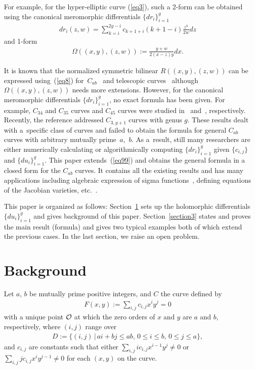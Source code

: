 \documentclass[pdftex]{sigma}
\numberwithin{equation}{section}
\theoremstyle{definition}
\begin{document}
For example, for the hyper-elliptic curve (\ref{eq3}), such a 2-form can be obtained using the canonical meromorphic dif\/ferentials $\{dr_i\}_{i=1}^g$
\begin{gather}\label{eq99}
dr_i(z,w)=\sum_{k=i}^{2g-i}c_{k+1+i}(k+1-i)\frac{z^{k}}{2w}dz
\end{gather}
and 1-form
\begin{gather*}\Omega((x,y),(z,w)):=\frac{y+w}{2(x-z)y}dx .\end{gather*}

It is known that the normalized symmetric bilinear $R((x,y),(z,w))$ can be expressed using~(\ref{eq8}) for~$C_{ab}$~\cite{nakayashiki} and telescopic curves~\cite{ayano} although $\Omega((x,y),(z,w))$ needs more extensions. However, for the canonical meromorphic dif\/ferentials $\{dr_i\}_{i=1}^g$, no exact formula has been given. For example, $C_{34}$ and $C_{35}$ curves and $C_{45}$ curves were studied in~\cite{DD} and~\cite{FF}, respectively.
Recently, the reference \cite{GG} addressed $C_{3,g+1}$ curves with genus $g$. These results dealt with a~specif\/ic class of curves and failed to obtain the formula for general $C_{ab}$ curves with arbitrary mutually prime~$a$,~$b$. As a~result, still many researchers are either numerically calculating or algorithmically computing $\{dr_i\}_{i=1}^g$ given $\{c_{i,j}\}$ and $\{du_i\}_{i=1}^g$. This paper extends~(\ref{eq99}) and obtains the general formula in a closed form for the $C_{ab}$ curves. It contains all the existing results and has many applications including algebraic expression of sigma functions~\cite{nakayashiki}, def\/ining equations of the Jacobian varieties, etc.~\cite{b,onishi}.

This paper is organized as follows: Section~\ref{section2} sets up the holomorphic dif\/ferentials $\{du_i\}_{i=1}^g$ and gives background of this paper.
Section~\ref{section3} states and proves the main result (formula) and gives two typical examples both of which extend the previous cases. In the last section, we raise an open problem.

\section{Background}\label{section2}

Let $a$, $b$ be mutually prime positive integers, and $C$ the curve def\/ined by
\begin{gather*}F(x,y):=\sum_{i,j}c_{i,j}x^iy^j=0\end{gather*}
with a unique point $\cal O$ at which the zero orders of $x$ and $y$ are $a$ and $b$, respectively, where $(i,j)$ range over
\begin{gather*}D:=\{(i,j)\,|\,ai+bj\leq ab,\, 0\leq i\leq b,\, 0\leq j\leq a\},\end{gather*}
and $c_{i,j}$ are constants such that either $ \sum\limits_{i,j} ic_{i,j}x^{i-1}y^j\not=0$ or $ \sum\limits_{i,j}jc_{i,j}x^iy^{j-1}\not=0$ for each $(x,y)$ on the curve.
\end{document}
